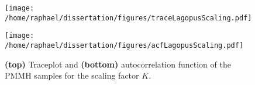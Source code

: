 \documentclass{article}
\begin{document}
	\begin{figure}[htb]
		\centering
		\begin{minipage}{0.9\textwidth}
			\centering
			\texttt{[image: /home/raphael/dissertation/figures/traceLagopusScaling.pdf]}
		\end{minipage}
		\begin{minipage}{0.9\textwidth}
			\centering
			\texttt{[image: /home/raphael/dissertation/figures/acfLagopusScaling.pdf]}
		\end{minipage}
		\caption{\textbf{(top)} Traceplot and \textbf{(bottom)} autocorrelation function of the PMMH samples for the scaling factor $K$.}
		\label{fig:lagopusScaling}
	\end{figure}
\end{document}
